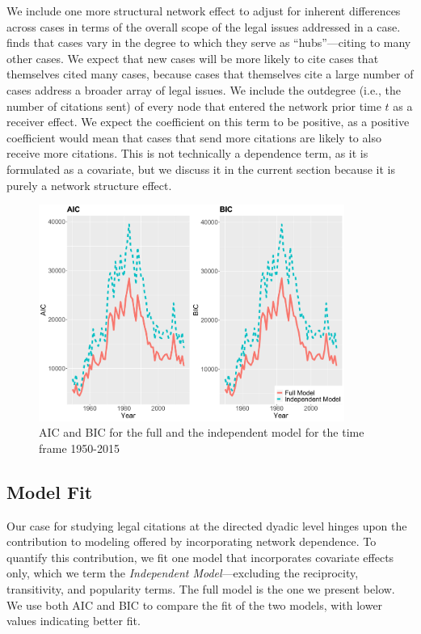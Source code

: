 \documentclass[headsepline=true, abstracton]{scrartcl}
\begin{document}
We include one more structural network effect to adjust for inherent differences across cases in terms of the overall scope of the legal issues addressed in a case.  \citet{fowler2008authority} finds that cases vary in the degree to which they serve as ``hubs''---citing to many other cases. We expect that new cases will be more likely to cite cases that themselves cited many cases, because cases that themselves cite a large number of cases address a broader array of legal issues. We include the outdegree (i.e., the number of citations sent) of every node that entered the network prior time $t$ as a receiver effect. We expect the coefficient on this term to be positive, as a positive coefficient would mean that cases that send more citations are likely to also receive more citations. This is not technically a dependence term, as it is formulated as a covariate, but we discuss it in the current section because it is purely a network structure effect.



\begin{figure}[bt]
	\centering
	\includegraphics[width=10cm ]{SCC_AIC_BIC.pdf}
	\caption{AIC and BIC for the full and the independent model for the time frame 1950-2015 }
	\label{AIC_BIC}
\end{figure}

\subsection{Model Fit}

Our case for studying legal citations at the directed dyadic level hinges upon the contribution to modeling offered by incorporating network dependence. To quantify this contribution, we fit one model that incorporates covariate effects only, which we term the {\em Independent Model}---excluding the reciprocity, transitivity, and popularity terms. The full model is the one we present below. We use both AIC and BIC to compare the fit of the two models, with lower values indicating better fit.  
\end{document}
